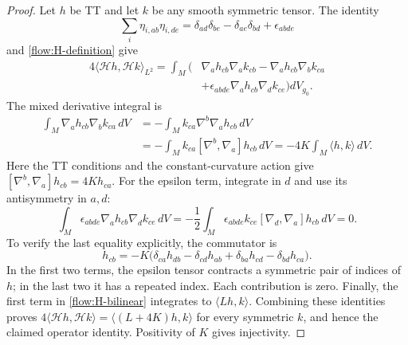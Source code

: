 \documentclass[11pt]{article}
\numberwithin{equation}{section}
\theoremstyle{definition}
\theoremstyle{remark}
\begin{document}
\begin{proof}
Let $h$ be TT and let $k$ be any smooth symmetric tensor.  The identity
\begin{equation}
 \sum_i\eta_{i,ab}\eta_{i,de}
      =\delta_{ad}\delta_{be}-\delta_{ae}\delta_{bd}
          +\epsilon_{abde}
\end{equation}
and \eqref{flow:H-definition} give
\begin{align}
 4\langle\mathcal Hh,\mathcal Hk\rangle_{L^2}
  =\int_M\bigl(&\nabla_ah_{cb}\nabla_ak_{cb}
           -\nabla_ah_{cb}\nabla_bk_{ca}\nonumber\\
           &+\epsilon_{abde}\nabla_ah_{cb}\nabla_dk_{ce}\bigr)dV_{g_0}.
 \label{flow:H-bilinear}
\end{align}
The mixed derivative integral is
\begin{align}
 \int_M\nabla_ah_{cb}\nabla_bk_{ca}\,dV
   &=-\int_Mk_{ca}\nabla^b\nabla_ah_{cb}\,dV\nonumber\\
   &=-\int_Mk_{ca}[\nabla^b,\nabla_a]h_{cb}\,dV
    =-4K\int_M\langle h,k\rangle\,dV.
 \label{flow:H-mixed-term}
\end{align}
Here the TT conditions and the constant-curvature action give
$[\nabla^b,\nabla_a]h_{cb}=4Kh_{ca}$.
For the epsilon term, integrate in $d$ and use its antisymmetry in
$a,d$:
\begin{equation}
 \int_M\epsilon_{abde}\nabla_ah_{cb}\nabla_dk_{ce}\,dV
   =-\frac12\int_M\epsilon_{abde}k_{ce}
                         [\nabla_d,\nabla_a]h_{cb}\,dV=0.
 \label{flow:H-epsilon-term}
\end{equation}
To verify the last equality explicitly, the commutator is
\begin{equation}
 [\nabla_d,\nabla_a]h_{cb}
   =-K\bigl(\delta_{ca}h_{db}-\delta_{cd}h_{ab}
               +\delta_{ba}h_{cd}-\delta_{bd}h_{ca}\bigr).
\end{equation}
In the first two terms, the epsilon tensor contracts a symmetric pair
of indices of $h$; in the last two it has a repeated index.
Each contribution is zero.  Finally, the first term in
\eqref{flow:H-bilinear} integrates to $\langle Lh,k\rangle$.
Combining these identities proves
$4\langle\mathcal Hh,\mathcal Hk\rangle
 =\langle(L+4K)h,k\rangle$ for every symmetric $k$, and hence the
claimed operator identity.  Positivity of $K$ gives injectivity.
\end{proof}
\end{document}
